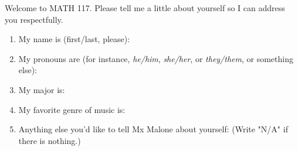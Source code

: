 \documentclass{handout}
\begin{document}
\maketitle

\par Welcome to MATH 117. Please tell me a little about yourself so I can address you respectfully.

\begin{enumerate}
  \item My name is (first/last, please): \\
  \item My pronouns are (for instance, \textit{he/him}, \textit{she/her}, or \textit{they/them}, or something else): \\
  \item My major is: \\
  \item My favorite genre of music is: \\
  \item Anything else you'd like to tell Mx Malone about yourself: (Write "N/A" if there is nothing.)
\end{enumerate}
\end{document}

